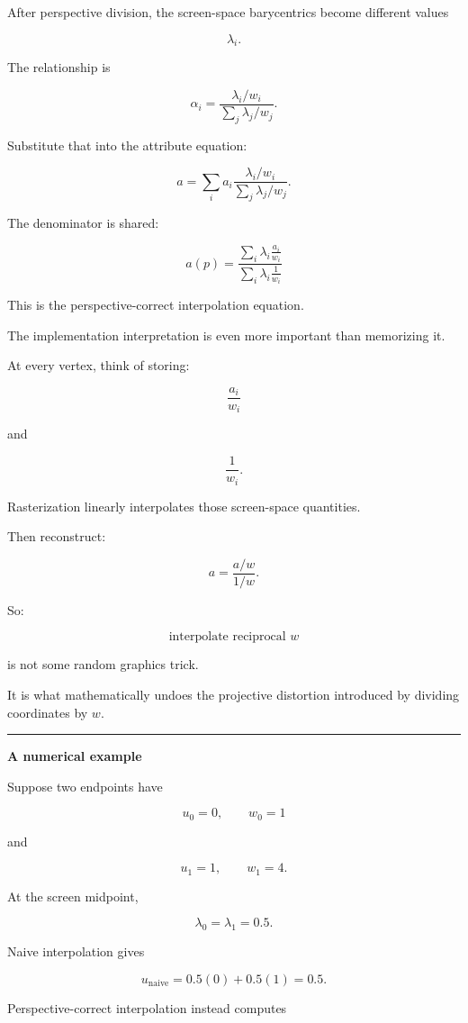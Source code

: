 After perspective division, the screen-space barycentrics become different values

\[
\lambda_i.
\]

The relationship is

\[
\alpha_i
=
\frac{\lambda_i/w_i}
{\sum_j\lambda_j/w_j}.
\]

Substitute that into the attribute equation:

\[
a=
\sum_i
a_i
\frac{\lambda_i/w_i}
{\sum_j\lambda_j/w_j}.
\]

The denominator is shared:

\[
\boxed{
a(p)
=
\frac{
\displaystyle
\sum_i\lambda_i\frac{a_i}{w_i}
}{
\displaystyle
\sum_i\lambda_i\frac1{w_i}
}
}
\]

This is the perspective-correct interpolation equation.

The implementation interpretation is even more important than memorizing it.

At every vertex, think of storing:

\[
\frac{a_i}{w_i}
\]

and

\[
\frac1{w_i}.
\]

Rasterization linearly interpolates those screen-space quantities.

Then reconstruct:

\[
a=
\frac{a/w}{1/w}.
\]

So:

\[
\boxed{
\text{interpolate reciprocal }w
}
\]

is not some random graphics trick.

It is what mathematically undoes the projective distortion introduced by dividing coordinates by \(w\).

\begin{center}\rule{0.5\linewidth}{0.5pt}\end{center}

\textbf{A numerical example}

Suppose two endpoints have

\[
u_0=0,\qquad w_0=1
\]

and

\[
u_1=1,\qquad w_1=4.
\]

At the screen midpoint,

\[
\lambda_0=\lambda_1=0.5.
\]

Naive interpolation gives

\[
u_{\text{naive}}
=
0.5(0)+0.5(1)=0.5.
\]

Perspective-correct interpolation instead computes

